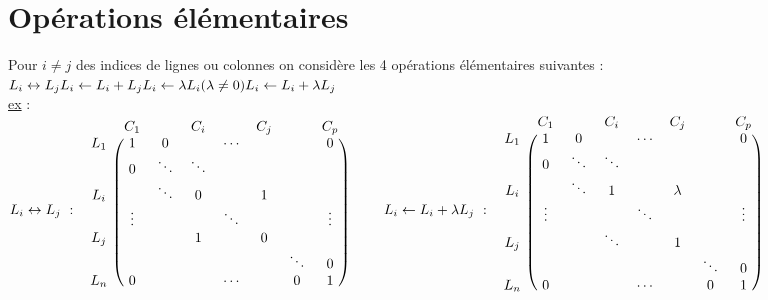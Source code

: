 	\section{Opérations élémentaires}
		\traitd Pour $i\neq j$ des indices de lignes ou colonnes on considère les 4 opérations élémentaires suivantes :\\
		${} \hfill L_i \leftrightarrow L_j \hfill L_i \leftarrow L_i + L_j \hfill {} \\
		{} \hfill L_i \leftarrow \lambda L_i (\lambda \neq 0) \hfill L_i \leftarrow L_i + \lambda L_j \hfill {}$ \trait
		\\ \underline{ex} : \\ \hspace*{-0.9cm}
		{\scriptsize $L_i \leftrightarrow L_j ~:~ \begin{blockarray}{cccccccc}
		& C_1 & & C_i & & C_j & & C_p \\ 
		\begin{block}{c(ccccccc)}
		L_1 & 1 & 0 & & \cdots & & & 0 \\ & 0 & \ddots & \ddots & & & & \\ L_i & & \ddots & 0 & & 1 & & \\ & \vdots & & & \ddots & & & \vdots
		\\ L_j & & & 1 & & 0 & & \\ & & & & & & \ddots & 0 \\ L_n & 0 & & & \cdots & & 0 & 1  \\
		\end{block}
		\end{blockarray} ~~~~~~~~ L_i \leftarrow L_i+ \lambda L_j ~:~
		\begin{blockarray}{cccccccc}
		& C_1 & & C_i & & C_j & & C_p \\ 
		\begin{block}{c(ccccccc)}
		L_1 & 1 & 0 & & \cdots & & & 0 \\ & 0 & \ddots & \ddots & & & & \\ L_i & & \ddots & 1 & & \lambda & & \\ & \vdots & & & \ddots & & & \vdots
		\\ L_j & & & \ddots & & 1 & & \\ & & & & & & \ddots & 0 \\ L_n & 0 & & & \cdots & & 0 & 1  \\
		\end{block}
		\end{blockarray} $ } \vspace*{0.5cm} \\
